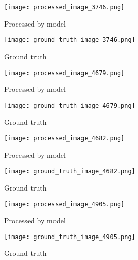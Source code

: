 \documentclass[12pt, a4paper]{article}
\begin{document}
\begin{figure}[ht]
  \centering
  \begin{minipage}[b]{0.45\textwidth}
    \texttt{[image: processed\_image\_3746.png]}
    \caption{Processed by model}
    \label{fig:processed_4}
  \end{minipage}
  \hfill
  \begin{minipage}[b]{0.45\textwidth}
    \texttt{[image: ground\_truth\_image\_3746.png]}
    \caption{Ground truth}
    \label{fig:ground_truth_4}
  \end{minipage}
\end{figure}

\begin{figure}[ht]
  \centering
  \begin{minipage}[b]{0.45\textwidth}
    \texttt{[image: processed\_image\_4679.png]}
    \caption{Processed by model}
    \label{fig:processed_5}
  \end{minipage}
  \hfill
  \begin{minipage}[b]{0.45\textwidth}
    \texttt{[image: ground\_truth\_image\_4679.png]}
    \caption{Ground truth}
    \label{fig:ground_truth_5}
  \end{minipage}
\end{figure}

\begin{figure}[ht]
  \centering
  \begin{minipage}[b]{0.45\textwidth}
    \texttt{[image: processed\_image\_4682.png]}
    \caption{Processed by model}
    \label{fig:processed_6}
  \end{minipage}
  \hfill
  \begin{minipage}[b]{0.45\textwidth}
    \texttt{[image: ground\_truth\_image\_4682.png]}
    \caption{Ground truth}
    \label{fig:ground_truth_6}
  \end{minipage}
\end{figure}

\begin{figure}[ht]
  \centering
  \begin{minipage}[b]{0.45\textwidth}
    \texttt{[image: processed\_image\_4905.png]}
    \caption{Processed by model}
    \label{fig:processed_7}
  \end{minipage}
  \hfill
  \begin{minipage}[b]{0.45\textwidth}
    \texttt{[image: ground\_truth\_image\_4905.png]}
    \caption{Ground truth}
    \label{fig:ground_truth_7}
  \end{minipage}
\end{figure}
\end{document}
